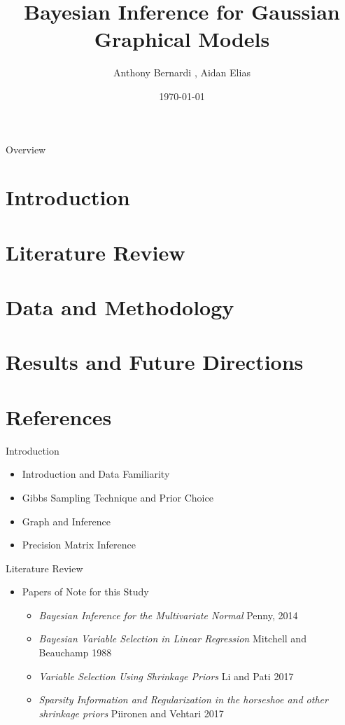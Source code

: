 \documentclass{beamer}
\title{Bayesian Inference for Gaussian Graphical Models}
\author{Anthony Bernardi\inst{1} , Aidan Elias\inst{1}}
\institute{\inst{1} University of Kentucky - Department of Statistics}
\date{\today}
\begin{document}
\begin{frame}
   \titlepage 
\end{frame}

\begin{frame}{Overview} 
  \tableofcontents
\end{frame} 

\section{Introduction}
\section{Literature Review}
\section{Data and Methodology}
\section{Results and Future Directions}
\section*{References}

\begin{frame}{Introduction}
  
  \begin{itemize}
    \item Introduction and Data Familiarity
    \item Gibbs Sampling Technique and Prior Choice 
    \item Graph and Inference
    \item Precision Matrix Inference 
  \end{itemize}

\end{frame}

\begin{frame}{Literature Review}

  \begin{itemize}
    \item Papers of Note for this Study 
      \begin{itemize}
        \item \textit{Bayesian Inference for the Multivariate Normal} Penny, 2014 
        \item \textit{Bayesian Variable Selection in Linear Regression} Mitchell and Beauchamp 1988   
        \item \textit{Variable Selection Using Shrinkage Priors} Li and Pati 2017
        \item \textit{Sparsity Information and Regularization in the horseshoe and other shrinkage priors} Piironen and Vehtari 2017
      \end{itemize}
  \end{itemize}
\end{frame}
\end{document}
